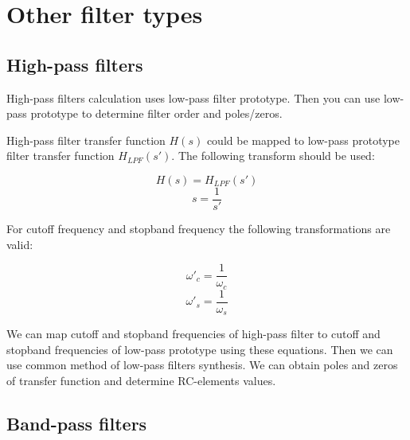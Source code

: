 

\chapter{Other filter types}
\label{sec:other-filt}
\section{High-pass filters}

High-pass filters calculation uses low-pass filter prototype. Then you can use
low-pass prototype to determine filter order and poles/zeros.


High-pass filter transfer function $H(s)$ could be mapped to low-pass prototype
filter transfer function $H_{LPF}(s')$. The following transform should be used:

\begin{equation}
 H(s)=H_{LPF}(s')
\end{equation}
\begin{equation}
 s=\frac{1}{s'}
\end{equation}

For cutoff frequency and stopband frequency the following transformations are
valid:

\begin{equation}
 \omega'_c=\frac{1}{\omega_c}
\end{equation}
\begin{equation}
  \omega'_s=\frac{1}{\omega_s}
\end{equation}

We can map cutoff and stopband frequencies of high-pass filter to cutoff
and stopband frequencies of low-pass prototype using these equations. Then we
can use common method of low-pass filters synthesis. We can obtain poles and
zeros of transfer function and determine RC-elements values.



\section{Band-pass filters}

